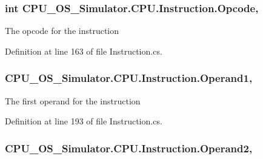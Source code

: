\subsubsection[{Opcode}]{\setlength{\rightskip}{0pt plus 5cm}int C\+P\+U\+\_\+\+O\+S\+\_\+\+Simulator.\+C\+P\+U.\+Instruction.\+Opcode\hspace{0.3cm}{\ttfamily [get]}, {\ttfamily [set]}}\label{class_c_p_u___o_s___simulator_1_1_c_p_u_1_1_instruction_af56668feff9c8dab3c9335969a25e074}


The opcode for the instruction 



Definition at line 163 of file Instruction.\+cs.

\hypertarget{class_c_p_u___o_s___simulator_1_1_c_p_u_1_1_instruction_a5eaf08ac611da1175f38f93defdee8d5}{}
\subsubsection[{Operand1}]{ C\+P\+U\+\_\+\+O\+S\+\_\+\+Simulator.\+C\+P\+U.\+Instruction.\+Operand1\hspace{0.3cm}{\ttfamily [get]}, {\ttfamily [set]}}\label{class_c_p_u___o_s___simulator_1_1_c_p_u_1_1_instruction_a5eaf08ac611da1175f38f93defdee8d5}


The first operand for the instruction 



Definition at line 193 of file Instruction.\+cs.

\hypertarget{class_c_p_u___o_s___simulator_1_1_c_p_u_1_1_instruction_ab35e6667e7c2f42dd09965995e25ff2d}{}
\subsubsection[{Operand2}]{ C\+P\+U\+\_\+\+O\+S\+\_\+\+Simulator.\+C\+P\+U.\+Instruction.\+Operand2\hspace{0.3cm}{\ttfamily [get]}, {\ttfamily [set]}}\label{class_c_p_u___o_s___simulator_1_1_c_p_u_1_1_instruction_ab35e6667e7c2f42dd09965995e25ff2d}



